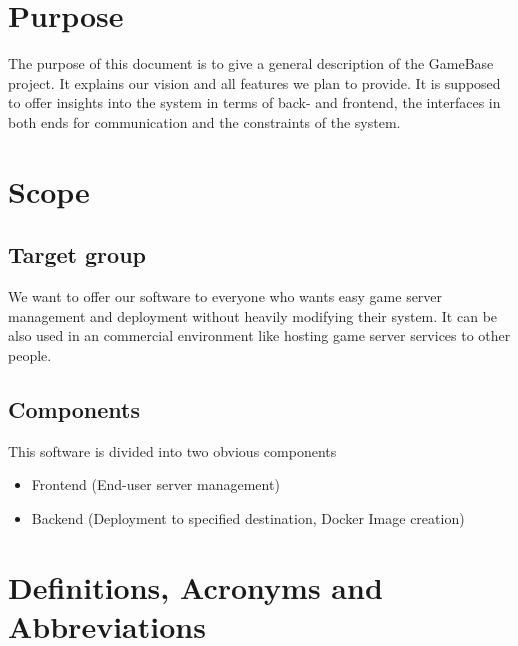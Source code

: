 \documentclass[a4paper,12pt,chapterprefix=false,bibliography=totoc,listof=totoc,]{scrreprt}
\begin{document}
\section{Purpose}
The purpose of this document is to give a general description of the GameBase project. It explains our vision and all features we plan to provide. It is supposed to offer insights into the system in terms of back- and frontend, the interfaces in both ends for communication and the constraints of the system.

\section{Scope}
\subsection*{Target group}
We want to offer our software to everyone who wants easy game server management and deployment without heavily modifying their system. It can be also used in an commercial environment like hosting game server services to other people.

\subsection*{Components}
This software is divided into two obvious components
\begin{itemize}
	\item Frontend (End-user server management)
	\item Backend (Deployment to specified destination, Docker Image creation)
\end{itemize}


\section{Definitions, Acronyms and Abbreviations}
\printabbreviations[title={}]
\end{document}
